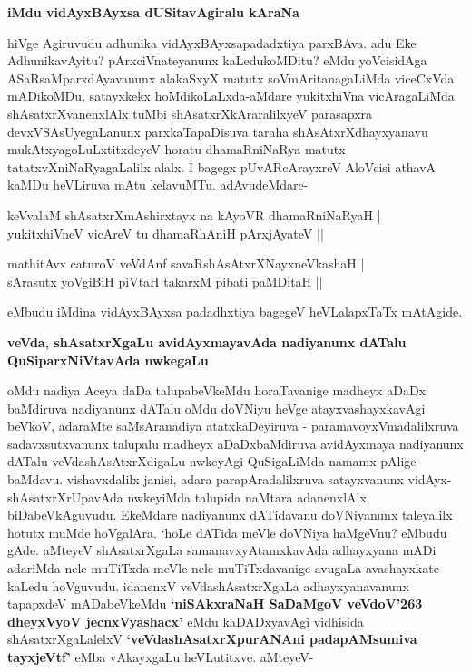 {\bigskip
\noindent
{\large\bf iMdu vidAyxBAyxsa dUSitavAgiralu kAraNa}}\label{page41e}
\medskip

\noindent
hiVge Agiruvudu adhunika vidAyxBAyxsapadadxtiya parxBAva. adu Eke Adhunika\break\-vAyitu? pArxciVnate\-yanunx kaLedukoMDitu? eMdu yoVcisidAga ASaRsaMparx\-dAyavanunx alakaSxyX matutx soVmAri\-tana\-gaLiMda viceCxVda mADikoMDu, satayxkekx hoMdikoLaLxda-aMdare yukitxhiVna vicAragaLiMda shAsatxrX\-vanenxlAlx tuMbi shAsatxrXkAra\-ralilxyeV parasapxra devxVSAsUyegaLanunx parxkaTapaDisuva taraha shAsAtxrXdhayxyanavu mukAtxya\-goLuLx\-titxdeyeV horatu dhamaRniNaRya matutx tatatxvXniNaRyagaLalilx  alalx. I bagegx pUvAR\-cArayxreV AloVcisi athavA kaMDu heVLiruva mAtu kelavuMTu. adAvudeMdare-

\begin{shloka}
keVvalaM shAsatxrXmAshirxtayx na kAyoVR dhamaRniNaRyaH |\\\label{64}
yukitxhiVneV vicAreV tu dhamaRhAniH pArxjAyateV ||
\end{shloka}

\smallskip

\begin{shloka}
mathitAvx caturoV veVdAnf savaRshAsAtxrXNayxneVkashaH |\\\label{41d}
sArasutx yoVgiBiH piVtaH takarxM pibati paMDitaH ||
\end{shloka}
eMbudu iMdina vidAyxBAyxsa padadhxtiya bagegeV heVLalapxTaTx mAtAgide.

{\bigskip
\noindent
{\large\bf veVda, shAsatxrXgaLu avidAyxmayavAda nadiyanunx dATalu QuSiparxNiVtavAda nwkegaLu}}\label{page42a}
\medskip

\noindent
oMdu nadiya Aceya daDa talupabeVkeMdu horaTavanige madheyx aDaDx baMdiruva nadiyanunx dATalu oMdu doVNiyu heVge atayxvashayxkavAgi beVkoV, adaraMte saMsAranadiya atatxkaDeyiruva - parama\-voyxVmadalilxruva sadavxsutxvanunx talupalu madheyx aDaDxbaMdiruva avidAyxmaya nadiyanunx dATalu veVda\-shAsAtxrXdigaLu nwkeyAgi QuSigaLiMda namamx pAlige baMdavu. vishavxdalilx janisi, adara parapAradalilx\-ruva satayxvanunx vidAyx-shAsatxrXrUpavAda nwkeyiMda talupida naMtara adanenxlAlx biDabeVkAguvudu. EkeM\-dare nadiyanunx dATidavanu doVNiyanunx taleyalilx hotutx muMde hoVgalAra. `hoLe dATida meVle doVNiya haMgeVnu? eMbudu gAde. aMteyeV shAsatxrXgaLa samanavxyAtamxkavAda adhayxyana mADi adariMda nele muTiTxda meVle nele muTiTxdavanige avugaLa avashayxkate kaLedu hoVguvudu. idanenxV\- veVda\-shAsatxrX\-gaLa adhayxyanavanunx tapapxdeV mADabeVkeMdu {\bf `niSAkxraNaH SaDaMgoV veVdoV\char'263 dheyxVyoV jecnxVyashacx'}\label{42a} eMdu kaDADxyavAgi vidhisida shAsatxrXgaLalelxV  {\bf `veVdashAsatxrXpurANAni padapAMsumiva tayxjeVtf'\label{42b}} eMba vAkayx\-gaLu heVLutitxve. aMteyeV-


